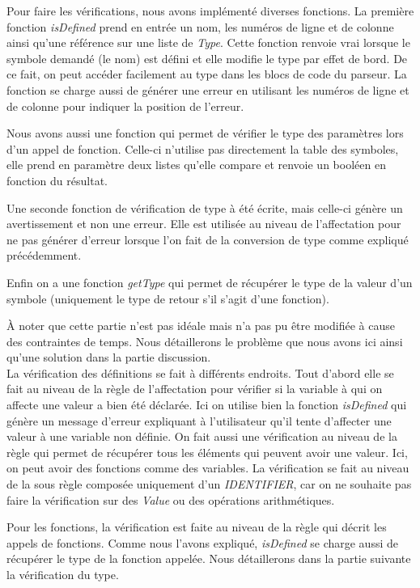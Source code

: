 \documentclass[a4paper]{article}%
\begin{document}
Pour faire les vérifications, nous avons implémenté diverses fonctions. La
première fonction \textit{isDefined} prend en entrée un nom, les numéros de
ligne et de colonne ainsi qu'une référence sur une liste de \textit{Type}.
Cette fonction renvoie vrai lorsque le symbole demandé (le nom) est défini et
elle modifie le type par effet de bord. De ce fait, on peut accéder facilement
au type dans les blocs de code du parseur. La fonction se charge aussi
de générer une erreur en utilisant les numéros de ligne et de colonne pour
indiquer la position de l'erreur.

Nous avons aussi une fonction qui permet de vérifier le type des paramètres lors
d'un appel de fonction. Celle-ci n'utilise pas directement la table des
symboles, elle prend en paramètre deux listes qu'elle compare et renvoie un
booléen en fonction du résultat.

Une seconde fonction de vérification de type à été écrite, mais celle-ci génère
un avertissement et non une erreur. Elle est utilisée au niveau de l'affectation
pour ne pas générer d'erreur lorsque l'on fait de la conversion de type comme
expliqué précédemment.

Enfin on a une fonction \textit{getType} qui permet de récupérer le type de la
valeur d'un symbole (uniquement le type de retour s'il s'agit d'une fonction).

À noter que cette partie n'est pas idéale mais n'a pas pu être modifiée à cause
des contraintes de temps. Nous détaillerons le problème que nous avons ici ainsi
qu'une solution dans la partie discussion.\\

La vérification des définitions se fait à différents endroits. Tout d'abord elle
se fait au niveau de la règle de l'affectation pour vérifier si la variable à
qui on affecte une valeur a bien été déclarée. Ici on utilise bien la fonction
\textit{isDefined} qui génère un message d'erreur expliquant à l'utilisateur
qu'il tente d'affecter une valeur à une variable non définie. On fait aussi une
vérification au niveau de la règle qui permet de récupérer tous les éléments qui
peuvent avoir une valeur. Ici, on peut avoir des fonctions comme des variables.
La vérification se fait au niveau de la sous règle composée uniquement d'un
\textit{IDENTIFIER}, car on ne souhaite pas faire la vérification sur des
\textit{Value} ou des opérations arithmétiques.

Pour les fonctions, la vérification est faite au niveau de la règle qui décrit
les appels de fonctions. Comme nous l'avons expliqué, \textit{isDefined} se
charge aussi de récupérer le type de la fonction appelée. Nous détaillerons dans
la partie suivante la vérification du type.
\end{document}
